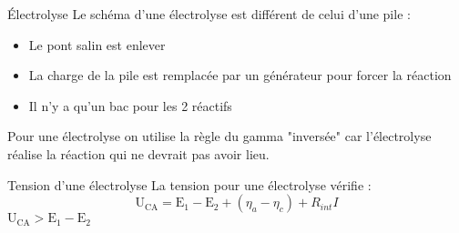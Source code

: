 \documentclass[french, a4paper, 11pt, twocolumn]{article}
\begin{document}
    \begin{cadre}{Électrolyse}
        Le schéma d'une électrolyse est différent de celui d'une pile :
            \begin{itemize}[label=\(\bullet\)]
                \item Le pont salin est enlever
                \item La charge de la pile est remplacée par un générateur pour forcer la réaction
                \item Il n'y a qu'un bac pour les 2 réactifs
            \end{itemize}

        \tcblower
        Pour une électrolyse on utilise la règle du gamma "inversée" car l'électrolyse réalise
        la réaction qui ne devrait pas avoir lieu.
    \end{cadre}

    \begin{cadre}{Tension d'une électrolyse}
        La tension pour une électrolyse vérifie :
            \[\mathrm{U_{CA}=E_1-E_2}+(\eta_a-\eta_c)+R_{int}I\]
        \tcblower
            \(\mathrm{U_{CA}>E_1-E_2}\)
    \end{cadre}
\end{document}
